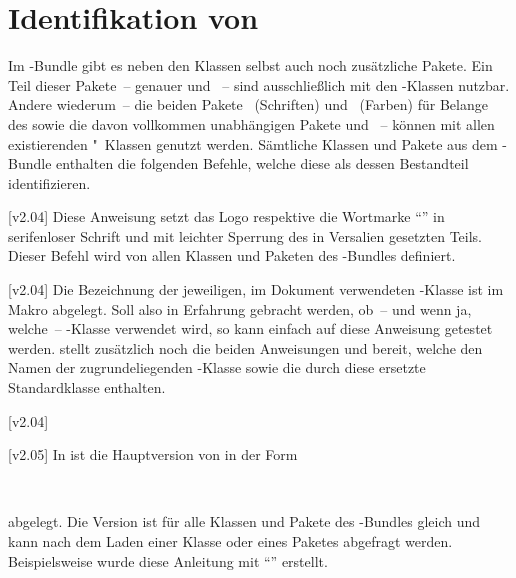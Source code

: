 \chapter{Identifikation von \TUDScript}
%
\begin{Entity}{}
Im \TUDScript-Bundle gibt es neben den Klassen selbst auch noch zusätzliche 
Pakete. Ein Teil dieser Pakete~-- genauer  und 
~-- sind ausschließlich mit den \TUDScript-Klassen nutzbar.
Andere wiederum~-- die beiden Pakete ~(Schriften) und 
~(Farben) für Belange des \CDs sowie die davon vollkommen 
unabhängigen Pakete  und ~-- können mit 
allen existierenden "~Klassen genutzt werden. Sämtliche Klassen 
und Pakete aus dem \TUDScript-Bundle enthalten die folgenden Befehle, welche 
diese als dessen Bestandteil identifizieren.

\begin{Declaration}
  {}
  [v2.04]
\printdeclarationlist
%
Diese Anweisung setzt das Logo respektive die Wortmarke \enquote{\TUDScript{}} 
in serifenloser Schrift und mit leichter Sperrung des in Versalien gesetzten 
Teils. Dieser Befehl wird von allen Klassen und Paketen des \TUDScript-Bundles 
definiert.
\end{Declaration}

\begin{Declaration}
  {}
  [v2.04]
\printdeclarationlist
%
Die Bezeichnung der jeweiligen, im Dokument verwendeten \TUDScript-Klasse ist 
im Makro  abgelegt. Soll also in Erfahrung gebracht 
werden, ob~-- und wenn ja, welche~-- \TUDScript-Klasse verwendet wird, so kann 
einfach auf diese Anweisung getestet werden. \KOMAScript stellt zusätzlich 
noch die beiden Anweisungen  und  
bereit, welche den Namen der zugrundeliegenden \KOMAScript-Klasse sowie die 
durch diese ersetzte Standardklasse enthalten.
\end{Declaration}

\begin{Declaration}
  {}
  [v2.04]
\begin{Declaration}
  {}
  [v2.05]
\printdeclarationlist
%
In  ist die Hauptversion von \TUDScript in der Form
\begin{quoting}
~~
\end{quoting}
abgelegt. Die Version ist für alle Klassen und Pakete des \TUDScript-Bundles
gleich und kann nach dem Laden einer Klasse oder eines Paketes abgefragt 
werden. Beispielsweise wurde diese Anleitung mit \enquote{\TUDScriptVersion{}} 
erstellt.


\end{Declaration}
\end{Declaration}
\end{Entity}
